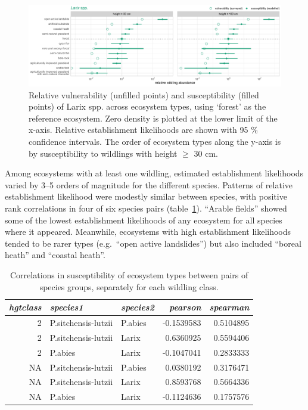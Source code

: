 \documentclass[
]{article}
\begin{document}
\begin{figure}
\centering
\includegraphics{figures/susceptibility/L.pdf}
\caption{\label{fig:susceptibility-L}Relative vulnerability (unfilled points) and susceptibility (filled points) of Larix spp. across ecosystem types, using `forest' as the reference ecosystem. Zero density is plotted at the lower limit of the x-axis. Relative establishment likelihoods are shown with 95 \% confidence intervals. The order of ecosystem types along the y-axis is by susceptibility to wildlings with height \(\geq\) 30 cm.}
\end{figure}

Among ecosystems with at least one wildling, estimated establishment likelihoods
varied by 3--5 orders of magnitude for the different species. Patterns of
relative establishment likelihood were modestly similar between species, with
positive rank correlations in four of six species pairs
(table~\ref{tab:species-correlation-table}). ``Arable fields'' showed some of the
lowest establishment likelihoods of any ecosystem for all species where it
appeared. Meanwhile, ecosystems with high establishment likelihoods tended to be
rarer types (e.g.~``open active landslides'') but also included ``boreal heath'' and
``coastal heath''.

\begin{table}

\caption{\label{tab:species-correlation-table}Correlations in susceptibility of ecosystem types between pairs of species groups, separately for each wildling class.}
\centering
\begin{tabular}[t]{rllrr}
\toprule
\em{hgtclass} & \em{species1} & \em{species2} & \em{pearson} & \em{spearman}\\
\midrule
2 & P.sitchensis-lutzii & P.abies & -0.1539583 & 0.5104895\\
2 & P.sitchensis-lutzii & Larix & 0.6360925 & 0.5594406\\
2 & P.abies & Larix & -0.1047041 & 0.2833333\\
NA & P.sitchensis-lutzii & P.abies & 0.0380192 & 0.3176471\\
NA & P.sitchensis-lutzii & Larix & 0.8593768 & 0.5664336\\
\addlinespace
NA & P.abies & Larix & -0.1124636 & 0.1757576\\
\bottomrule
\end{tabular}
\end{table}
\end{document}
